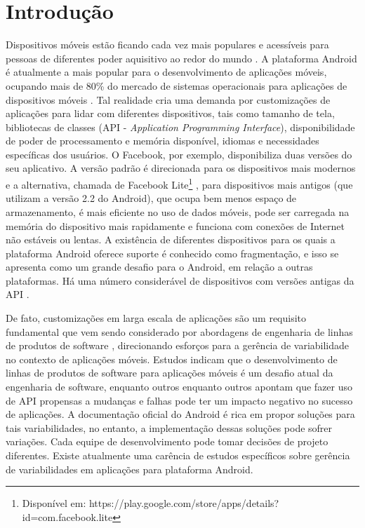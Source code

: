 \chapter{Introdução}

Dispositivos móveis estão ficando cada vez mais populares e acessíveis para
pessoas de diferentes poder aquisitivo ao redor do mundo \cite{Lhamas2014}.
A plataforma Android é atualmente a mais popular para o desenvolvimento de aplicações
móveis, ocupando mais de 80\% do mercado de sistemas operacionais para aplicações
de dispositivos móveis \cite{jim2014}. Tal realidade cria uma demanda por customizações
de aplicações para lidar com diferentes dispositivos, tais como tamanho de tela,
bibliotecas de classes (API - \textit{Application Programming Interface}),
disponibilidade de poder de processamento e memória
disponível, idiomas e necessidades específicas dos usuários. O Facebook, por exemplo,
disponibiliza duas versões do seu aplicativo. A versão padrão é direcionada para
os dispositivos mais modernos e a alternativa, chamada de
Facebook Lite\footnote{Disponível em: https://play.google.com/store/apps/details?id=com.facebook.lite}
, para dispositivos mais antigos (que utilizam a versão 2.2 do Android), que
ocupa bem menos espaço de armazenamento, é mais eficiente no uso de dados móveis,
pode ser carregada na memória do dispositivo mais rapidamente e funciona com conexões
de Internet não estáveis ou lentas. A existência de diferentes dispositivos para
os quais a plataforma Android oferece suporte é conhecido como fragmentação, e isso
se apresenta como um grande desafio para o Android, em relação a outras plataformas.
Há uma número considerável de dispositivos com versões antigas da API \cite{Gronli2014}.

De fato, customizações em larga escala de aplicações são um requisito fundamental
que vem sendo considerado por abordagens de engenharia de linhas de produtos de software
\cite{Alves2007} \cite{Alves2005}, direcionando esforços para a gerência de variabilidade
no contexto de aplicações móveis. Estudos \cite{Dehlinger2011} indicam que o desenvolvimento
de linhas de produtos de software para aplicações móveis é um desafio atual da
engenharia de software, enquanto outros enquanto outros \cite{Linares-Vasquez2013}
apontam que fazer uso de API propensas a mudanças e falhas pode ter um impacto
negativo no sucesso de aplicações. A documentação oficial do Android \cite{GuiaAndroid}
é rica em propor soluções para tais variabilidades, no entanto, a implementação
dessas soluções pode sofrer variações. Cada equipe de desenvolvimento pode tomar
decisões de projeto diferentes. Existe atualmente uma carência de estudos
específicos sobre gerência de variabilidades em aplicações para plataforma Android.


